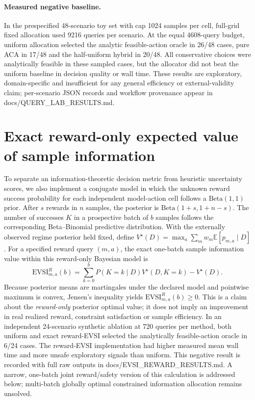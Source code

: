 \documentclass[11pt]{article}
\begin{document}
\paragraph{Measured negative baseline.}
In the prespecified 48-scenario toy set with cap 1024 samples per cell, full-grid fixed allocation used 9216 queries per scenario. At the equal 4608-query budget, uniform allocation selected the analytic feasible-action oracle in 26/48 cases, pure ACA in 17/48 and the half-uniform hybrid in 20/48. All conservative choices were analytically feasible in these sampled cases, but the allocator did not beat the uniform baseline in decision quality or wall time. These results are exploratory, domain-specific and insufficient for any general efficiency or external-validity claim; per-scenario JSON records and workflow provenance appear in docs/QUERY_LAB_RESULTS.md.

\section{Exact reward-only expected value of sample information}
To separate an information-theoretic decision metric from heuristic uncertainty scores, we also implement a conjugate model in which the unknown reward success probability for each independent model-action cell follows a $\mathrm{Beta}(1,1)$ prior. After $s$ rewards in $n$ samples, the posterior is $\mathrm{Beta}(1+s,1+n-s)$. The number of successes $K$ in a prospective batch of $b$ samples follows the corresponding Beta--Binomial predictive distribution. With the externally observed regime posterior held fixed, define $V^\star(D)=\max_a\sum_m w_m\mathbb E[p_{m,a}\mid D]$. For a specified reward query $(m,a)$, the exact one-batch sample information value within this reward-only Bayesian model is
\[
 \mathrm{EVSI}^{R}_{m,a}(b)=
 \sum_{k=0}^{b}P(K=k\mid D)V^\star(D,K=k)-V^\star(D).
\]
Because posterior means are martingales under the declared model and pointwise maximum is convex, Jensen's inequality yields $\mathrm{EVSI}^{R}_{m,a}(b)\ge0$. This is a claim about the \emph{reward-only} posterior optimal value; it does not imply an improvement in real realized reward, constraint satisfaction or sample efficiency. In an independent 24-scenario synthetic ablation at 720 queries per method, both uniform and exact reward-EVSI selected the analytically feasible-action oracle in 6/24 cases. The reward-EVSI implementation had higher measured mean wall time and more unsafe exploratory signals than uniform. This negative result is recorded with full raw outputs in docs/EVSI_REWARD_RESULTS.md. A narrow, one-batch joint reward/safety version of this calculation is addressed below; multi-batch globally optimal constrained information allocation remains unsolved.
\end{document}

